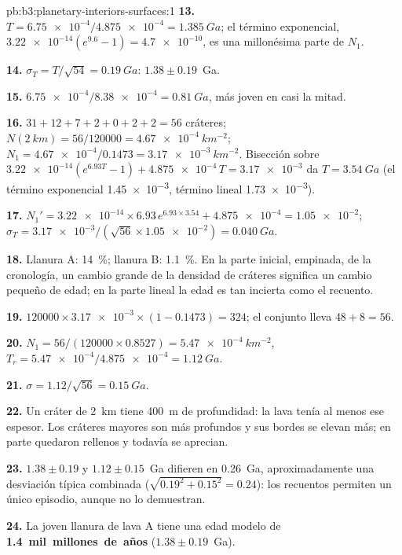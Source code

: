 \begin{solution}{pb:b3:planetary-interiors-surfaces:1}
\textbf{13.} $T = \num{6.75e-4}/\num{4.875e-4} = \qty{1.385}{Ga}$; el
término exponencial, $\num{3.22e-14}(e^{9.6} - 1) = \num{4.7e-10}$, es una
millonésima parte de $N_1$.

\textbf{14.} $\sigma_T = T/\sqrt{54} = \qty{0.19}{Ga}$: $1.38 \pm 0.19$~Ga.

\textbf{15.} $\num{6.75e-4}/\num{8.38e-4} = \qty{0.81}{Ga}$, más joven en
casi la mitad.

\textbf{16.} $31 + 12 + 7 + 2 + 0 + 2 + 2 = 56$ cráteres; $N(\qty{2}{km}) =
56/120000 = \qty{4.67e-4}{km^{-2}}$; $N_1 = \num{4.67e-4}/0.1473 =
\qty{3.17e-3}{km^{-2}}$. Bisección sobre $\num{3.22e-14}(e^{6.93T} - 1) +
\num{4.875e-4}\,T = \num{3.17e-3}$ da $T = \qty{3.54}{Ga}$ (el término
exponencial \num{1.45e-3}, término lineal \num{1.73e-3}).

\textbf{17.} $N_1' = \num{3.22e-14}\times6.93\,e^{6.93\times3.54} +
\num{4.875e-4} = \num{1.05e-2}$; $\sigma_T = \num{3.17e-3}/(\sqrt{56}\times
\num{1.05e-2}) = \qty{0.040}{Ga}$.

\textbf{18.} Llanura A: \qty{14}{\percent}; llanura B: \qty{1.1}{\percent}. En
la parte inicial, empinada, de la cronología, un cambio grande de la
densidad de cráteres significa un cambio pequeño de edad; en la parte lineal la edad es tan
incierta como el recuento.

\textbf{19.} $120000\times\num{3.17e-3}\times(1 - 0.1473) = 324$; el conjunto
lleva $48 + 8 = 56$.

\textbf{20.} $N_1 = 56/(120000\times0.8527) = \qty{5.47e-4}{km^{-2}}$,
$T_r = \num{5.47e-4}/\num{4.875e-4} = \qty{1.12}{Ga}$.

\textbf{21.} $\sigma = 1.12/\sqrt{56} = \qty{0.15}{Ga}$.

\textbf{22.} Un cráter de \qty{2}{km} tiene \qty{400}{m} de profundidad: la lava tenía
al menos ese espesor. Los cráteres mayores son más profundos y sus bordes se elevan más;
en parte quedaron rellenos y todavía se aprecian.

\textbf{23.} $1.38 \pm 0.19$ y $1.12 \pm 0.15$~Ga difieren en \qty{0.26}{Ga},
aproximadamente una desviación típica combinada ($\sqrt{0.19^2 + 0.15^2} = 0.24$):
los recuentos permiten un único episodio, aunque no lo demuestran.

\textbf{24.} La joven llanura de lava A tiene una edad modelo de
\textbf{1.4~mil~millones~de~años} ($1.38 \pm 0.19$~Ga).
\end{solution}
